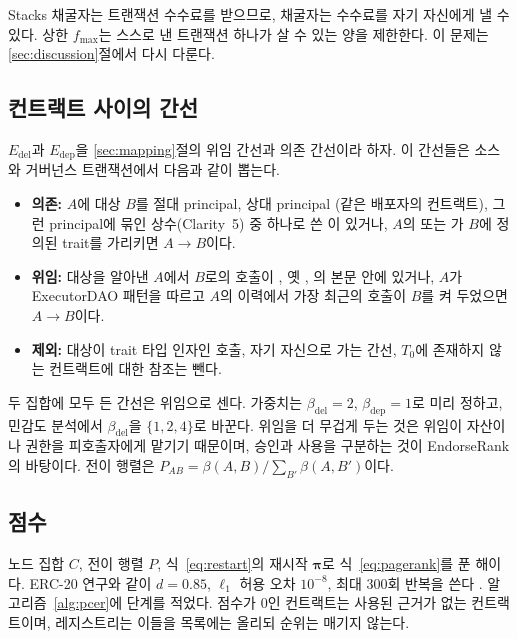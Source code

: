 Stacks 채굴자는 트랜잭션 수수료를 받으므로, 채굴자는 수수료를 자기 자신에게 낼 수 있다. 상한 $f_{\max}$는 스스로 낸 트랜잭션 하나가 살 수 있는 양을 제한한다. 이 문제는 \ref{sec:discussion}절에서 다시 다룬다.

\subsection{컨트랙트 사이의 간선}

$E_{\mathrm{del}}$과 $E_{\mathrm{dep}}$을 \ref{sec:mapping}절의 위임 간선과 의존 간선이라 하자. 이 간선들은 소스와 거버넌스 트랜잭션에서 다음과 같이 뽑는다.

\begin{itemize}
\item \textbf{의존:} $A$에 대상 $B$를 절대 principal, 상대 principal (같은 배포자의 컨트랙트), 그런 principal에 묶인 상수(Clarity~5) 중 하나로 쓴 이 있거나, $A$의  또는 가 $B$에 정의된 trait를 가리키면 $A\to B$이다.
\item \textbf{위임:} 대상을 알아낸 $A$에서 $B$로의 호출이 , 옛 , 의 본문 안에 있거나, $A$가 ExecutorDAO 패턴을 따르고 $A$의 이력에서 가장 최근의  호출이 $B$를 켜 두었으면 $A\to B$이다.
\item \textbf{제외:} 대상이 trait 타입 인자인 호출, 자기 자신으로 가는 간선, $T_0$에 존재하지 않는 컨트랙트에 대한 참조는 뺀다.
\end{itemize}

두 집합에 모두 든 간선은 위임으로 센다. 가중치는 $\beta_{\mathrm{del}}=2$, $\beta_{\mathrm{dep}}=1$로 미리 정하고, 민감도 분석에서 $\beta_{\mathrm{del}}$을 $\{1,2,4\}$로 바꾼다. 위임을 더 무겁게 두는 것은 위임이 자산이나 권한을 피호출자에게 맡기기 때문이며, 승인과 사용을 구분하는 것이 EndorseRank의 바탕이다. 전이 행렬은 $P_{AB}=\beta(A,B)/\sum_{B'}\beta(A,B')$이다.

\subsection{점수}

 노드 집합 $C$, 전이 행렬 $P$, 식~\eqref{eq:restart}의 재시작 $\boldsymbol{\pi}$로 식~\eqref{eq:pagerank}를 푼 해이다. ERC-20 연구와 같이 $d=0.85$, $\ell_1$ 허용 오차 $10^{-8}$, 최대 300회 반복을 쓴다 \cite{kwon2026endorserank}. 알고리즘~\ref{alg:pcer}에 단계를 적었다. 점수가 0인 컨트랙트는 사용된 근거가 없는 컨트랙트이며, 레지스트리는 이들을 목록에는 올리되 순위는 매기지 않는다.

